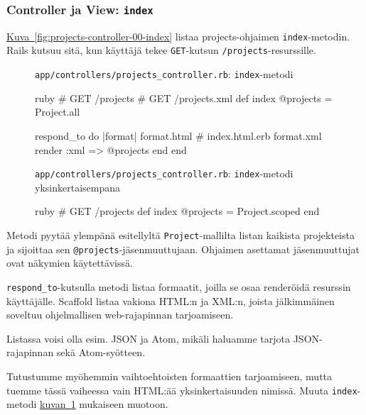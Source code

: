 \documentclass{article}
\newenvironment{myfigure}[1][tbp]{
  \begin{figure}[#1]
    \centering
    \begin{lrbox}{\myfigurebox}
      \begin{minipage}{\textwidth}
}{
      \end{minipage}
    \end{lrbox}
    \colorbox{blue!4}{\usebox{\myfigurebox}}
  \end{figure}
}
\newcommand{\myref}[2]{\hyperref[#2]{#1~\ref*{#2}}}
\newcommand{\pdfforeignlanguage}[2]{\texorpdfstring{\foreignlanguage{#1}{#2}}{#2}}
\newcommand{\eng}[1]{\pdfforeignlanguage{english}{#1}}
\begin{document}
\subsubsection{\eng{Controller} ja \eng{View}: \texttt{index}}

\begin{samepage}
\myref{Kuva}{fig:projects-controller-00-index} listaa projects-ohjaimen
\texttt{index}-metodin. Rails kutsuu sitä, kun käyttäjä tekee
\texttt{GET}-kutsun \texttt{/projects}-resurssille.

\begin{myfigure}[H]
\caption{\texttt{app/controllers/projects\_controller.rb}:
\texttt{index}-metodi}
\label{fig:projects-controller-00-index}

\begin{pygmented}{ruby}
  # GET /projects
  # GET /projects.xml
  def index
    @projects = Project.all

    respond_to do |format|
      format.html # index.html.erb
      format.xml  { render :xml => @projects }
    end
  end
\end{pygmented}

\caption{\texttt{app/controllers/projects\_controller.rb}:
\texttt{index}-metodi yksinkertaisempana}
\label{fig:projects-controller-01-index}

\begin{pygmented}{ruby}
  # GET /projects
  def index
    @projects = Project.scoped
  end
\end{pygmented}
\end{myfigure}
\end{samepage}

Metodi pyytää ylempänä esitellyltä \texttt{Project}-mallilta listan kaikista
projekteista ja sijoittaa sen \texttt{@projects}-jäsenmuuttujaan. Ohjaimen
asettamat jäsenmuuttujat ovat näkymien käytettävissä.

\texttt{respond\_to}-kutsulla metodi listaa formaatit, joilla se osaa
renderöidä resurssin käyttäjälle. \eng{Scaffold} listaa vakiona HTML:n ja
XML:n, joista jälkimmäinen soveltuu ohjelmallisen web-rajapinnan tarjoamiseen.

Listassa voisi olla esim. JSON ja Atom, mikäli haluamme tarjota JSON-rajapinnan
sekä Atom-syötteen.

Tutustumme myöhemmin vaihtoehtoisten formaattien tarjoamiseen, mutta tuemme
tässä vaiheessa vain HTML:ää yksinkertaisuuden nimissä. Muuta
\texttt{index}-metodi \myref{kuvan}{fig:projects-controller-01-index} mukaiseen
muotoon.
\end{document}

